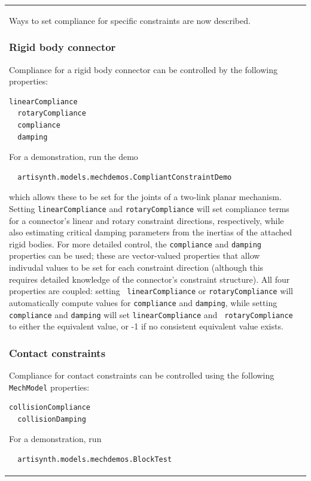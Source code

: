 \documentclass{article}
\begin{document}
\begin{tabular}{ll}
Ways to set compliance for specific constraints are now described.

\subsubsection*{Rigid body connector}

Compliance for a rigid body connector can be controlled by the
following properties:

\begin{lstlisting}[]
  linearCompliance
  rotaryCompliance
  compliance
  damping
\end{lstlisting}

For a demonstration, run the demo 
\begin{verbatim}
  artisynth.models.mechdemos.CompliantConstraintDemo
\end{verbatim}
which allows these to be set for the joints of a two-link planar
mechanism. Setting {\tt linearCompliance} and {\tt rotaryCompliance}
will set compliance terms for a connector's linear and rotary
constraint directions, respectively, while also estimating critical
damping parameters from the inertias of the attached rigid bodies.  For
more detailed control, the {\tt compliance} and {\tt damping}
properties can be used; these are vector-valued properties that allow
indivudal values to be set for each constraint direction (although
this requires detailed knowledge of the connector's constraint
structure). All four properties are coupled: setting {\tt
linearCompliance} or {\tt rotaryCompliance} will automatically compute
values for {\tt compliance} and {\tt damping}, while setting {\tt
compliance} and {\tt damping} will set {\tt linearCompliance} and {\tt
rotaryCompliance} to either the equivalent value, or -1 if no
consistent equivalent value exists.

\subsubsection*{Contact constraints}

Compliance for contact constraints can be controlled using the
following {\tt MechModel} properties:

\begin{lstlisting}[]
  collisionCompliance
  collisionDamping
\end{lstlisting}

For a demonstration, run 
\begin{verbatim}
  artisynth.models.mechdemos.BlockTest
\end{verbatim}


\end{tabular}
\end{document}
